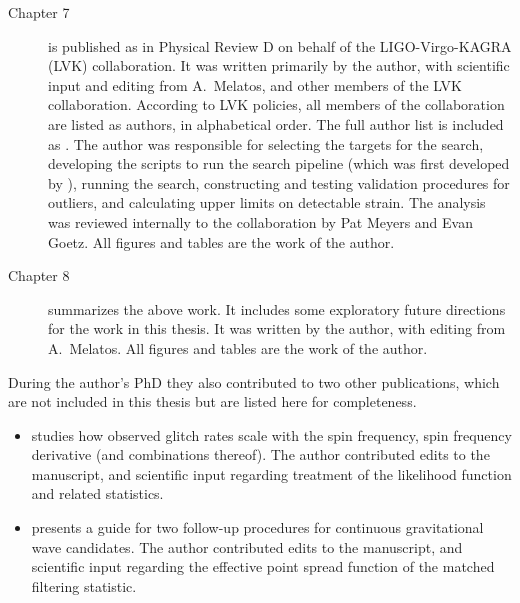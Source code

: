 \begin{description}
  \item[Chapter 7] is published as \citet{o3amxp} in Physical Review D on behalf of the LIGO-Virgo-KAGRA (LVK) collaboration. It was written primarily by the author, with scientific input and editing from A.~Melatos, and other members of the LVK collaboration. According to LVK policies, all members of the collaboration are listed as authors, in alphabetical order. The full author list is included as . The author was responsible for selecting the targets for the search, developing the scripts to run the search pipeline (which was first developed by \citet{Suvorova2016, Suvorova2017}), running the search, constructing and testing validation procedures for outliers, and calculating upper limits on detectable strain. The analysis was reviewed internally to the collaboration by Pat Meyers and Evan Goetz. All figures and tables are the work of the author.
  \item[Chapter 8] summarizes the above work. It includes some exploratory future directions for the work in this thesis. It was written by the author, with editing from A.~Melatos. All figures and tables are the work of the author.
\end{description}

During the author's PhD they also contributed to two other publications, which are not included in this thesis but are listed here for completeness.
\begin{itemize}
  \item \citet{Millhouse2022} studies how observed glitch rates scale with the spin frequency, spin frequency derivative (and combinations thereof). The author contributed edits to the manuscript, and scientific input regarding treatment of the likelihood function and related statistics.
  \item \citet{Jones2022} presents a guide for two follow-up procedures for continuous gravitational wave candidates. The author contributed edits to the manuscript, and scientific input regarding the effective point spread function of the matched filtering statistic.
\end{itemize}
